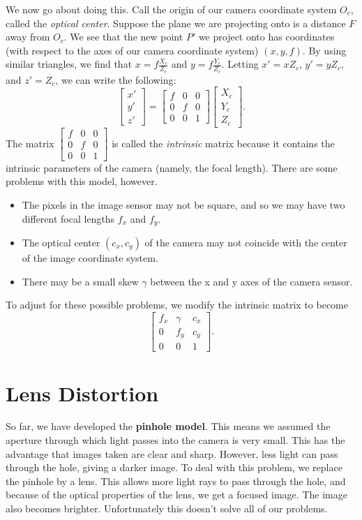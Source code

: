 \documentclass{article}
\begin{document}
We now go about doing this. Call the origin of our camera coordinate system $O_c$, called the \textit{optical center}. Suppose the plane we are projecting onto is a distance $F$ away from $O_c$. We see that the new point $P'$ we project onto has coordinates (with respect to the axes of our camera coordinate system) $(x,y,f)$. By using similar triangles, we find that $x = f\frac{X_c}{Z_c}$ and $y= f\frac{Y_c}{Z_c}$. Letting $x' = xZ_c$, $y' = yZ_c$, and $z' = Z_c$, we can write the following:
\[
\begin{bmatrix}
    x' \\
    y' \\
    z'
\end{bmatrix} = \begin{bmatrix}
    f & 0 & 0 \\ 
    0 & f & 0 \\
    0 & 0 & 1 
\end{bmatrix}\begin{bmatrix}
    X_c \\
    Y_c \\
    Z_c
\end{bmatrix}
.\] The matrix $\begin{bmatrix}
    f & 0 & 0 \\
    0 & f & 0 \\
    0 & 0 & 1 
\end{bmatrix}$ is called the \textit{intrinsic} matrix because it contains the intrinsic parameters of the camera (namely, the focal length). There are some problems with this model, however.
\begin{itemize}
    \item The pixels in the image sensor may not be square, and so we may have two different focal lengths $f_x$ and $f_y$.
    \item The optical center $(c_x, c_y)$ of the camera may not coincide with the center of the image coordinate system.
    \item There may be a small skew $\gamma$ between the x and y axes of the camera sensor.
\end{itemize}

To adjust for these possible problems, we modify the intrinsic matrix to become
\[\begin{bmatrix}
    f_x & \gamma & c_x \\
    0 & f_y & c_y \\
    0 & 0 & 1
\end{bmatrix}.\]

\section{Lens Distortion}
So far, we have developed the \textbf{pinhole model}. This means we assumed the aperture through which light passes into the camera is very small. This has the advantage that images taken are clear and sharp. However, less light can pass through the hole, giving a darker image. To deal with this problem, we replace the pinhole by a lens. This allows more light rays to pass through the hole, and because of the optical properties of the lens, we get a focused image. The image also becomes brighter. Unfortunately this doesn't solve all of our problems. 
\end{document}
